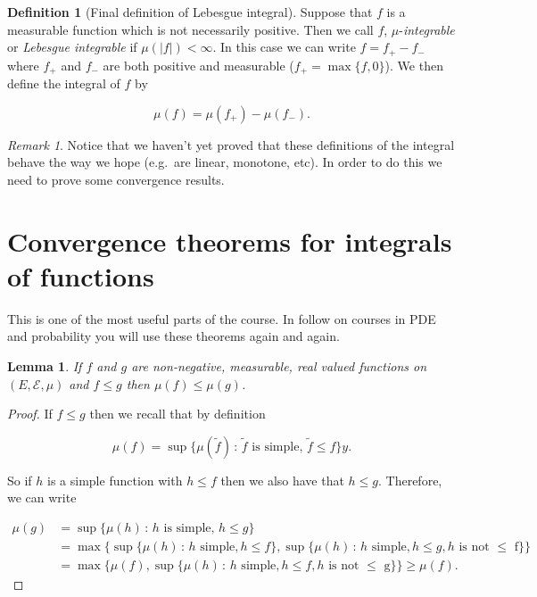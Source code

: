 \documentclass[
]{book}
\newtheorem{lemma}{Lemma}[chapter]
\theoremstyle{definition}
\newtheorem{definition}{Definition}[chapter]
\theoremstyle{definition}
\theoremstyle{definition}
\theoremstyle{definition}
\theoremstyle{remark}
\newtheorem*{remark}{Remark}
\begin{document}
\begin{definition}[Final definition of Lebesgue integral]
Suppose that \(f\) is a measurable function which is not necessarily positive. Then we call \(f\), \(\mu\)-\emph{integrable} or \emph{Lebesgue integrable} if \(\mu(|f|)< \infty\). In this case we can write \(f = f_+ - f_{-}\) where \(f_+\) and \(f_-\) are both positive and measurable (\(f_+ = \max\{f, 0\}\)). We then define the integral of \(f\) by

\[ \mu(f) = \mu(f_+) - \mu(f_-). \]
\end{definition}

\begin{remark}
Notice that we haven't yet proved that these definitions of the integral behave the way we hope (e.g.~are linear, monotone, etc). In order to do this we need to prove some convergence results.
\end{remark}

\hypertarget{convergence-theorems-for-integrals-of-functions}{%
\section{Convergence theorems for integrals of functions}\label{convergence-theorems-for-integrals-of-functions}}

This is one of the most useful parts of the course. In follow on courses in PDE and probability you will use these theorems again and again.

\begin{lemma}
If \(f\) and \(g\) are non-negative, measurable, real valued functions on \((E, \mathcal{E}, \mu)\) and \(f \leq g\) then \(\mu(f) \leq \mu(g)\).
\end{lemma}

\begin{proof}
If \(f \leq g\) then we recall that by definition

\[\mu(f) = \sup\{ \mu(\tilde{f}) \,:\, \mbox{$\tilde{f}$ is simple},\, \tilde{f} \leq f\}y.\]

So if \(h\) is a simple function with \(h \leq f\) then we also have that \(h \leq g\). Therefore, we can write

\begin{align*} \mu(g) &= \sup\{ \mu(h) \,:\, \mbox{$h$ is simple},\, h \leq g\} \\ &= \max\{\sup\{ \mu(h)\, :\, \mbox{$h$ simple}, h \leq f\}, \sup\{ \mu(h)\, :\, \mbox{$h$ simple}, h \leq g, \mbox{$h$ is not $\leq$ f}\} \}\\ &= \max\{ \mu(f), \sup\{ \mu(h)\, :\, \mbox{$h$ simple}, h \leq f, \mbox{$h$ is not $\leq$ g}\}\} \geq \mu(f).\end{align*}
\end{proof}
\end{document}
